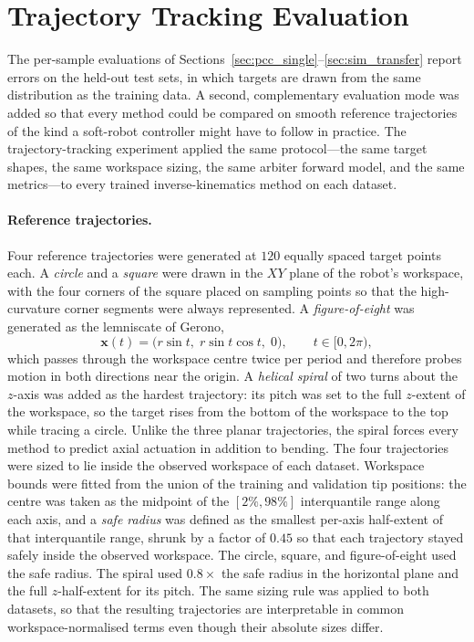 \section{Trajectory Tracking Evaluation}
\label{sec:traj}

The per-sample evaluations of Sections~\ref{sec:pcc_single}--\ref{sec:sim_transfer} report errors on the held-out test sets, in which targets are drawn from the same distribution as the training data. A second, complementary evaluation mode was added so that every method could be compared on smooth reference trajectories of the kind a soft-robot controller might have to follow in practice. The trajectory-tracking experiment applied the same protocol---the same target shapes, the same workspace sizing, the same arbiter forward model, and the same metrics---to every trained inverse-kinematics method on each dataset.

\paragraph{Reference trajectories.}
Four reference trajectories were generated at $120$ equally spaced target points each. A \emph{circle} and a \emph{square} were drawn in the $XY$ plane of the robot's workspace, with the four corners of the square placed on sampling points so that the high-curvature corner segments were always represented. A \emph{figure-of-eight} was generated as the lemniscate of Gerono,
\begin{equation}
  \mathbf{x}(t) = \bigl( r \sin t,\; r \sin t \cos t,\; 0 \bigr), \qquad t \in [0, 2\pi), \label{eq:traj_fig8}
\end{equation}
which passes through the workspace centre twice per period and therefore probes motion in both directions near the origin. A \emph{helical spiral} of two turns about the $z$-axis was added as the hardest trajectory: its pitch was set to the full $z$-extent of the workspace, so the target rises from the bottom of the workspace to the top while tracing a circle. Unlike the three planar trajectories, the spiral forces every method to predict axial actuation in addition to bending. The four trajectories were sized to lie inside the observed workspace of each dataset. Workspace bounds were fitted from the union of the training and validation tip positions: the centre was taken as the midpoint of the $[2\%, 98\%]$ interquantile range along each axis, and a \emph{safe radius} was defined as the smallest per-axis half-extent of that interquantile range, shrunk by a factor of $0.45$ so that each trajectory stayed safely inside the observed workspace. The circle, square, and figure-of-eight used the safe radius. The spiral used $0.8 \times$ the safe radius in the horizontal plane and the full $z$-half-extent for its pitch. The same sizing rule was applied to both datasets, so that the resulting trajectories are interpretable in common workspace-normalised terms even though their absolute sizes differ.


